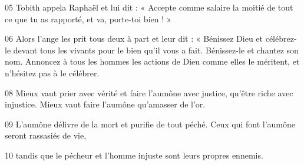 
05 Tobith appela Raphaël et lui dit : « Accepte comme salaire la moitié de tout ce que tu as rapporté, et va, porte-toi bien ! »

06 Alors l’ange les prit tous deux à part et leur dit : « Bénissez Dieu et célébrez-le devant tous les vivants pour le bien qu’il vous a fait. Bénissez-le et chantez son nom. Annoncez à tous les hommes les actions de Dieu comme elles le méritent, et n’hésitez pas à le célébrer.

08 Mieux vaut prier avec vérité et faire l’aumône avec justice, qu’être riche avec injustice. Mieux vaut faire l’aumône qu’amasser de l’or.

09 L’aumône délivre de la mort et purifie de tout péché. Ceux qui font l’aumône seront rassasiés de vie,

10 tandis que le pécheur et l’homme injuste sont leurs propres ennemis.
